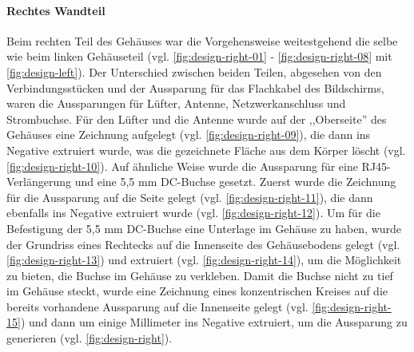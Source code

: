 \paragraph{Rechtes Wandteil}
Beim rechten Teil des Gehäuses war die Vorgehensweise weitestgehend die selbe wie beim linken Gehäuseteil (vgl. \ref{fig:design-right-01} - \ref{fig:design-right-08} mit \ref{fig:design-left}). Der Unterschied zwischen beiden Teilen, abgesehen von den Verbindungsstücken und der Aussparung für das Flachkabel des Bildschirms, waren die Aussparungen für Lüfter, Antenne, Netzwerkanschluss und Strombuchse. Für den Lüfter und die Antenne wurde auf der ,,Oberseite'' des Gehäuses eine Zeichnung aufgelegt (vgl. \ref{fig:design-right-09}), die dann ins Negative extruiert wurde, was die gezeichnete Fläche aus dem Körper löscht (vgl. \ref{fig:design-right-10}). Auf ähnliche Weise wurde die Aussparung für eine RJ45-Verlängerung und eine 5,5 mm DC-Buchse gesetzt. Zuerst wurde die Zeichnung für die Aussparung auf die Seite gelegt (vgl. \ref{fig:design-right-11}), die dann ebenfalls ins Negative extruiert wurde (vgl. \ref{fig:design-right-12}). Um für die Befestigung der 5,5 mm DC-Buchse eine Unterlage im Gehäuse zu haben, wurde der Grundriss eines Rechtecks auf die Innenseite des Gehäusebodens gelegt (vgl. \ref{fig:design-right-13}) und extruiert (vgl. \ref{fig:design-right-14}), um die Möglichkeit zu bieten, die Buchse im Gehäuse zu verkleben. Damit die Buchse nicht zu tief im Gehäuse steckt, wurde eine Zeichnung eines konzentrischen Kreises auf die bereits vorhandene Aussparung auf die Innenseite gelegt  (vgl. \ref{fig:design-right-15}) und dann um einige Millimeter ins Negative extruiert, um die Aussparung zu generieren (vgl. \ref{fig:design-right}).\\
